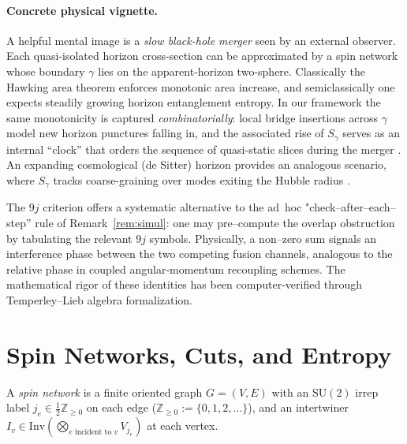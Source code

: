 \documentclass[11pt]{article}
\newcommand{\SU}{\mathrm{SU}(2)}
\newcommand{\Inv}{\mathrm{Inv}}
\newcommand{\Cut}{\gamma}
\newcommand{\NN}{\mathbb{Z}_{\ge 0}}
\begin{document}
\paragraph{Concrete physical vignette.}

A helpful mental image is a \emph{slow black-hole merger} seen 
by an external observer. Each quasi-isolated horizon cross-section can be approximated by a
spin network whose boundary $\Cut$ lies on the apparent-horizon two-sphere.
Classically the Hawking area theorem enforces monotonic area increase, and
semiclassically one expects steadily growing horizon entanglement entropy.
In our framework the same monotonicity is captured \emph{combinatorially}:
local bridge insertions across $\Cut$ model new horizon punctures falling
in, and the associated rise of $S_{\Cut}$ serves as an internal “clock” that
orders the sequence of quasi-static slices during the merger 
\cite{AshtekarKrishnan2004,BoothFairhurst2007}. An expanding cosmological
(de Sitter) horizon provides an analogous scenario, where $S_{\Cut}$
tracks coarse-graining over modes exiting the Hubble radius
\cite{GibbonsHawking1977}.


\begin{remark}
The $9j$ criterion offers a systematic alternative to the ad~hoc
"check–after–each–step'' rule of Remark~\ref{rem:simul}:
one may pre–compute the overlap obstruction by tabulating the relevant
$9j$ symbols.  Physically, a non–zero sum signals an interference phase
between the two competing fusion channels, analogous to the relative
phase in coupled angular‐momentum recoupling schemes. The mathematical rigor of these identities has been computer-verified through Temperley--Lieb algebra formalization.
\end{remark}


\section{Spin Networks, Cuts, and Entropy}

\begin{definition}\label{def:spinnet}
A \emph{spin network} is a finite oriented graph $G=(V,E)$ with an $\SU$ irrep label $j_e\in\tfrac{1}{2}\NN$ on each edge ($\NN:=\{0,1,2,\dots\}$), and an intertwiner $I_v\in\Inv\left(\bigotimes_{\text{$e$ incident to }v}V_{j_e}\right)$ at each vertex.
\end{definition}
\end{document}
